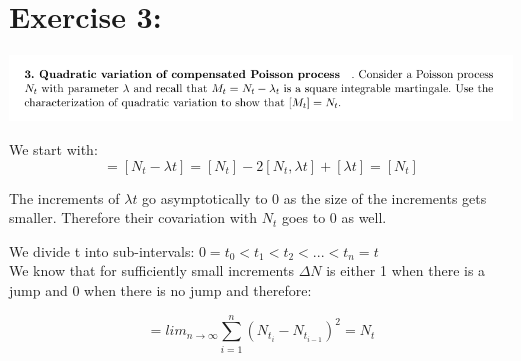 \documentclass[document.tex]{subfiles}
\begin{document}
\section*{Exercise 3:}

\includegraphics[width=\textwidth]{ex3.png}


We start with:
\begin{equation}
[M_t] = [N_t - \lambda t] = [N_t] - 2[N_t, \lambda t] + [\lambda t] = [N_t]
\end{equation}

The increments of $\lambda t$ go asymptotically to 0 as the size of the increments gets smaller. Therefore their covariation with $N_t$ goes to 0 as well.

We divide t into sub-intervals: $0 = t_0 < t_1 < t_2 < ... < t_n = t$ \\

We know that for sufficiently small increments $\Delta N$ is either 1 when there is a jump and 0 when there is no jump and therefore:

\begin{equation}
[N_t] = lim_{n \to \infty} \sum_{i = 1}^n (N_{t_i} - N_{t_{i - 1}})^2 = N_t
\end{equation}
\end{document}
